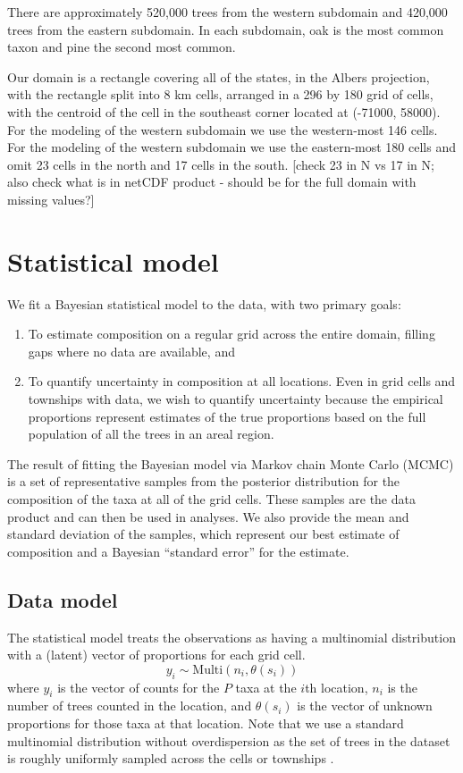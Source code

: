 \documentclass[12pt]{article}\usepackage[]{graphicx}\usepackage[]{color}
\begin{document}
There are approximately 520,000 trees from the western subdomain and
420,000 trees from the eastern subdomain. In each subdomain, oak is
the most common taxon and pine the second most common. 

Our domain is a rectangle covering all of the states, in the Albers
projection, with the rectangle split into 8 km cells, arranged in
a 296 by 180 grid of cells, with the centroid of the cell in the southeast
corner located at (-71000, 58000). For the modeling of the western
subdomain we use the western-most 146 cells. For the modeling of the
western subdomain we use the eastern-most 180 cells and omit 23 cells
in the north and 17 cells in the south. {[}check 23 in N vs 17 in
N; also check what is in netCDF product - should be for the full domain
with missing values?{]}


\section{Statistical model}

We fit a Bayesian statistical model to the data, with two primary
goals:
\begin{enumerate}
\item To estimate composition on a regular grid across the entire domain,
filling gaps where no data are available, and
\item To quantify uncertainty in composition at all locations. Even in grid
cells and townships with data, we wish to quantify uncertainty because
the empirical proportions represent estimates of the true proportions
based on the full population of all the trees in an areal region.
\end{enumerate}
The result of fitting the Bayesian model via Markov chain Monte Carlo
(MCMC) is a set of representative samples from the posterior distribution
for the composition of the taxa at all of the grid cells. These samples
are the data product and can then be used in analyses. We also provide
the mean and standard deviation of the samples, which represent our
best estimate of composition and a Bayesian ``standard error'' for
the estimate. 


\subsection{Data model}

The statistical model treats the observations as having a multinomial
distribution with a (latent) vector of proportions for each grid cell.
\[
y_{i}\sim\mbox{Multi}(n_{i},\theta(s_{i}))
\]
where $y_{i}$ is the vector of counts for the $P$ taxa at the $i$th
location, $n_{i}$ is the number of trees counted in the location,
and $\theta(s_{i})$ is the vector of unknown proportions for those
taxa at that location. Note that we use a standard multinomial distribution
without overdispersion as the set of trees in the dataset is roughly
uniformly sampled across the cells or townships \citep{Gori:etal:2015}.
\end{document}
